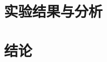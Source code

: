 \documentclass[12pt, UTF8, AutoFakeBold]{ctexart}  %
\begin{document}
  \section{\hei\xiaoer\textbf{实验结果与分析}}
  
  \newpage
  \section*{\hei\xiaoer\textbf{结论}}
  
  \newpage

  
  

  
  

\end{document}
